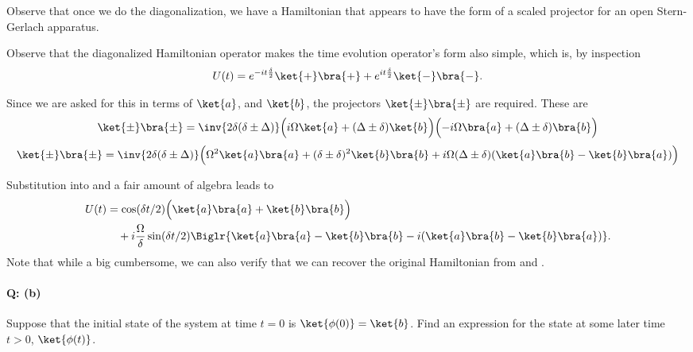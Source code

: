 {Observe that once we do the diagonalization, we have a Hamiltonian that appears to have the form of a scaled projector for an open Stern-Gerlach apparatus.

Observe that the diagonalized Hamiltonian operator makes the time evolution operator's form also simple, which is, by inspection
%
\begin{equation}\label{eqn:qmIexamPractice2008Dec:2:80}
U(t) =
e^{-i t \frac{\delta}{2}} \ket{+}\bra{+}
+ e^{i t \frac{\delta}{2}} \ket{-}\bra{-}.
\end{equation}

Since we are asked for this in terms of \(\ket{a}\), and \(\ket{b}\), the projectors \(\ket{\pm}\bra{\pm}\) are required.  These are
%
\begin{equation}\label{eqn:qmIexamPractice2008Dec:690}
\begin{aligned}
\ket{\pm}\bra{\pm}
&= \inv{2 \delta (\delta \pm \Delta)}
\Bigl( i \Omega \ket{a} + (\Delta \pm \delta) \ket{b} \Bigr)
\Bigl( -i \Omega \bra{a} + (\Delta \pm \delta) \bra{b} \Bigr) \\
\end{aligned}
\end{equation}
%
\begin{equation}\label{eqn:qmIexamPractice2008Dec:2:90}
\ket{\pm}\bra{\pm}
= \inv{2 \delta (\delta \pm \Delta)}
\Bigl(
\Omega^2 \ket{a}\bra{a}
+(\delta \pm \delta)^2 \ket{b}\bra{b}
+i \Omega (\Delta \pm \delta) (
\ket{a}\bra{b}
-\ket{b}\bra{a}
)
\Bigr)
\end{equation}

Substitution into  and a fair amount of algebra leads to
\begin{equation}\label{eqn:qmIexamPractice2008Dec:2:100}
\begin{aligned}
U(t) &= \cos(\delta t/2) \Bigl( \ket{a}\bra{a} + \ket{b}\bra{b} \Bigr) \\
&\quad
+ i \frac{\Omega}{\delta} \sin(\delta t/2) \Biglr{
\ket{a}\bra{a} - \ket{b}\bra{b}
-i (\ket{a}\bra{b} - \ket{b}\bra{a} )
}.
\end{aligned}
\end{equation}
Note that while a big cumbersome, we can also verify that we can recover the original Hamiltonian from  and .

\paragraph{Q: (b)}
Suppose that the initial state of the system at time \(t = 0\) is \(\ket{\phi(0)}= \ket{b}\).  Find an expression for the state at some later time \(t > 0\), \(\ket{\phi(t)}\).
}

